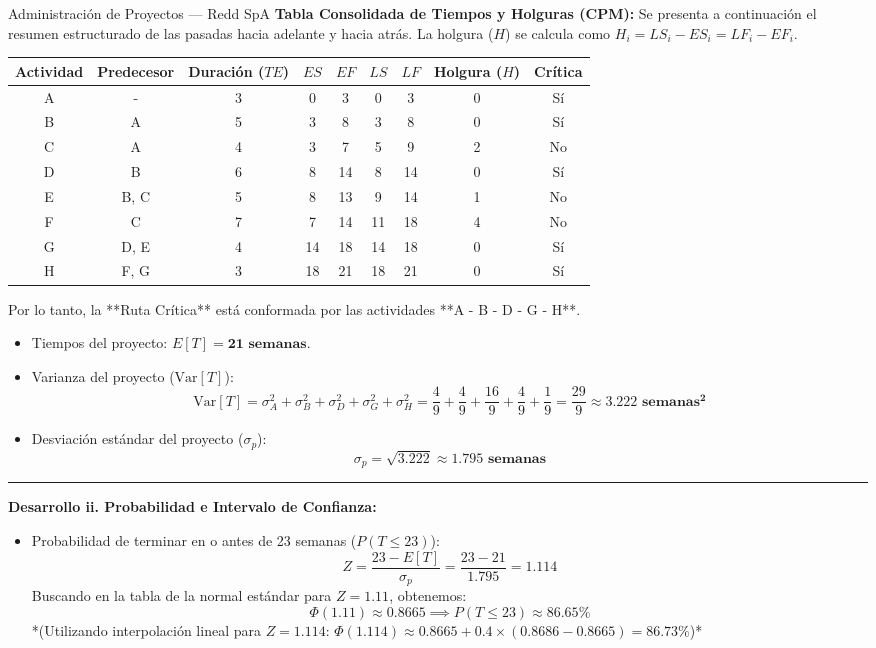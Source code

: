 \documentclass[11pt, a4paper]{article}
\begin{document}
\begin{ejercicio}{Administración de Proyectos --- Redd SpA}
  \textbf{Tabla Consolidada de Tiempos y Holguras (CPM):}
  Se presenta a continuación el resumen estructurado de las pasadas hacia adelante y hacia atrás. La holgura ($H$) se calcula como $H_i = LS_i - ES_i = LF_i - EF_i$.
  \begin{center}
    \small
    \begin{tabular}{ccccccccc}
      \toprule
      Actividad & Predecesor & Duración ($TE$) & $ES$ & $EF$ & $LS$ & $LF$ & Holgura ($H$) & Crítica \\
      \midrule
      A & - & 3 & 0 & 3 & 0 & 3 & 0 & Sí \\
      B & A & 5 & 3 & 8 & 3 & 8 & 0 & Sí \\
      C & A & 4 & 3 & 7 & 5 & 9 & 2 & No \\
      D & B & 6 & 8 & 14 & 8 & 14 & 0 & Sí \\
      E & B, C & 5 & 8 & 13 & 9 & 14 & 1 & No \\
      F & C & 7 & 7 & 14 & 11 & 18 & 4 & No \\
      G & D, E & 4 & 14 & 18 & 14 & 18 & 0 & Sí \\
      H & F, G & 3 & 18 & 21 & 18 & 21 & 0 & Sí \\
      \bottomrule
    \end{tabular}
  \end{center}

  Por lo tanto, la **Ruta Crítica** está conformada por las actividades **A - B - D - G - H**.
  \begin{itemize}
    \item Tiempos del proyecto: $E[T] = \mathbf{21 \text{ semanas}}$.
    \item Varianza del proyecto ($\text{Var}[T]$):
      \[
        \text{Var}[T] = \sigma_A^2 + \sigma_B^2 + \sigma_D^2 + \sigma_G^2 + \sigma_H^2 = \frac{4}{9} + \frac{4}{9} + \frac{16}{9} + \frac{4}{9} + \frac{1}{9} = \frac{29}{9} \approx \mathbf{3.222 \text{ semanas}^2}
      \]
    \item Desviación estándar del proyecto ($\sigma_p$):
      \[
        \sigma_p = \sqrt{3.222} \approx \mathbf{1.795 \text{ semanas}}
      \]
  \end{itemize}

  \rule{\textwidth}{0.2pt}

  \textbf{Desarrollo ii. Probabilidad e Intervalo de Confianza:}
  \begin{itemize}
    \item Probabilidad de terminar en o antes de 23 semanas ($P(T \le 23)$):
      \[
        Z = \frac{23 - E[T]}{\sigma_p} = \frac{23 - 21}{1.795} = 1.114
      \]
      Buscando en la tabla de la normal estándar para $Z = 1.11$, obtenemos:
      \[
        \Phi(1.11) \approx 0.8665 \implies P(T \le 23) \approx \mathbf{86.65\%}
      \]
      *(Utilizando interpolación lineal para $Z = 1.114$: $\Phi(1.114) \approx 0.8665 + 0.4 \times (0.8686 - 0.8665) = \mathbf{86.73\%}$)*


\end{itemize}
\end{ejercicio}
\end{document}
